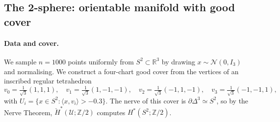 \documentclass[11pt]{article}
\newcommand{\R}{\mathbb{R}}
\newcommand{\Z}{\mathbb{Z}}
\theoremstyle{plain}
\theoremstyle{definition}
\theoremstyle{remark}
\begin{document}
\subsection{The 2-sphere: orientable manifold with good cover}\label{sec:exp-sphere}

\paragraph{Data and cover.}
We sample $n = 1000$ points uniformly from $S^2 \subset \R^3$ by drawing $x \sim \mathcal{N}(0, I_3)$ and normalising. We construct a four-chart good cover from the vertices of an inscribed regular tetrahedron
\[
v_0 = \tfrac{1}{\sqrt 3}(1,1,1),\quad v_1 = \tfrac{1}{\sqrt 3}(1,-1,-1),\quad v_2 = \tfrac{1}{\sqrt 3}(-1,1,-1),\quad v_3 = \tfrac{1}{\sqrt 3}(-1,-1,1),
\]
with $U_i = \{x \in S^2 : \langle x, v_i\rangle > -0.3\}$. The nerve of this cover is $\partial \Delta^3 \simeq S^2$, so by the Nerve Theorem, $\check{H}^*(\mathcal{U}; \Z/2)$ computes $H^*(S^2; \Z/2)$.
\end{document}
